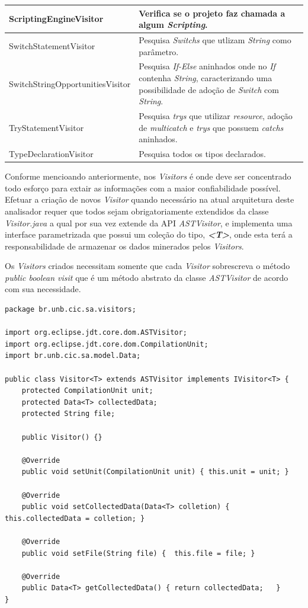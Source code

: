 \begin{table}[ht!]
\begin{tabular}{ >{\arraybackslash}p{2.2in} | >{\arraybackslash}m{3.8in} }
			ScriptingEngineVisitor & Verifica se o projeto faz chamada a algum \textit{Scripting}.\\ \hline
			
			SwitchStatementVisitor & Pesquisa \textit{Switchs} que utlizam \textit{String} como parâmetro.\\ \hline
			
			SwitchStringOpportunitiesVisitor &  Pesquisa \textit{If-Else} aninhados onde no \textit{If} contenha \textit{String}, caracterizando uma possibilidade de adoção de \textit{Switch} com \textit{String}.\\ \hline
			
			
			TryStatementVisitor & Pesquisa \textit{trys} que utilizar \textit{resource}, adoção de \textit{multicatch} e \textit{trys} que possuem \textit{catchs} aninhados.\\ \hline
			
			TypeDeclarationVisitor & Pesquisa todos os tipos declarados.\\ \hline 		
		\end{tabular}
\end{table}


Conforme mencioando anteriormente, nos \textit{Visitors} é onde deve ser concentrado todo esforço para extair as informações com a maior confiabilidade possível. Efetuar a criação de novos \textit{Visitor} quando necessário na atual arquitetura deste analisador requer que todos sejam  obrigatoriamente extendidos da classe \textit{Visitor.java} a qual por sua vez extende da \acs{API}  \textit{ASTVisitor}, e implementa uma interface parametrizada que possui um coleção do tipo, \textit{\textbf{<T>}}, onde esta terá a responsabilidade de armazenar os dados minerados pelos \textit{Visitors}. 

Os \textit{Visitors} criados necessitam somente que cada \textit{Visitor} sobrescreva o método \textit{public boolean visit} que é um método abstrato da classe \textit{ASTVisitor} de acordo com sua necessidade.

\begin{lstlisting}
package br.unb.cic.sa.visitors;

import org.eclipse.jdt.core.dom.ASTVisitor;
import org.eclipse.jdt.core.dom.CompilationUnit;
import br.unb.cic.sa.model.Data;

public class Visitor<T> extends ASTVisitor implements IVisitor<T> {
	protected CompilationUnit unit;
	protected Data<T> collectedData;
	protected String file;
	
	public Visitor() {}
	
	@Override
	public void setUnit(CompilationUnit unit) { this.unit = unit; }
	
	@Override
	public void setCollectedData(Data<T> colletion) { this.collectedData = colletion; }
	
	@Override
	public void setFile(String file) {	this.file = file; }

	@Override
	public Data<T> getCollectedData() {	return collectedData;	}	
}
\end{lstlisting}


